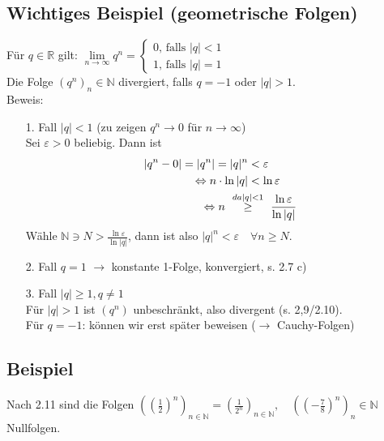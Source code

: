 \documentclass[12pt, titlepage]{article}
\newcommand{\R}{\mathds{R}}
\newcommand{\N}{\mathds{N}}
\newcommand{\infn}{n\rightarrow\infty}
\renewcommand{\*}{\cdot}
\renewcommand{\epsilon}{\varepsilon}
\begin{document}
	\subsection{Wichtiges Beispiel (geometrische Folgen)}
	Für $q\in\R$ gilt: 
	$\lim\limits_{\infn}q^n=\begin{cases}
	0\textrm{, falls }|q|<1\\
	1\textrm{, falls }|q|=1
	\end{cases}$\\
	Die Folge $(q^n)_n\in\N$ divergiert, falls $q=-1$ oder $|q|>1$.\\
	Beweis: \begin{itemize}
		\item[1. Fall] $|q|<1$ (zu zeigen $q^n\rightarrow 0$ für $\infn$)\\
		Sei $\epsilon>0$ beliebig. Dann ist
		\begin{align*}
			|q^n-0|=|q^n|=|q|^n&<\epsilon\\
			\Leftrightarrow n\*\ln|q|&<\ln\epsilon\\
			\Leftrightarrow n \qquad &\mathclap{\overset{da |q|<1}{\geq}}\qquad \frac{\ln\epsilon}{\ln|q|}
		\end{align*}
		Wähle $\N\ni N>\frac{\ln\epsilon}{\ln|q|}$, dann ist also $|q|^n<\epsilon\quad\forall n\geq N$.
		\item[2. Fall] $q=1$ $\rightarrow$ konstante 1-Folge, konvergiert, s. 2.7 c)
		\item[3. Fall] $|q|\geq 1, q\neq 1$\\
		Für $|q|>1$ ist $(q^n)$ unbeschränkt, also divergent (s. 2,9/2.10).\\
		Für $q=-1$: können wir erst später beweisen ($\rightarrow$ Cauchy-Folgen)
	\end{itemize}
	\subsection{Beispiel}
	Nach 2.11 sind die Folgen $((\frac{1}{2})^n)_{n\in\N}=(\frac{1}{2^n})_{n\in\N},\quad ((-\frac{7}{8})^n)_n\in\N$ Nullfolgen.
\end{document}
